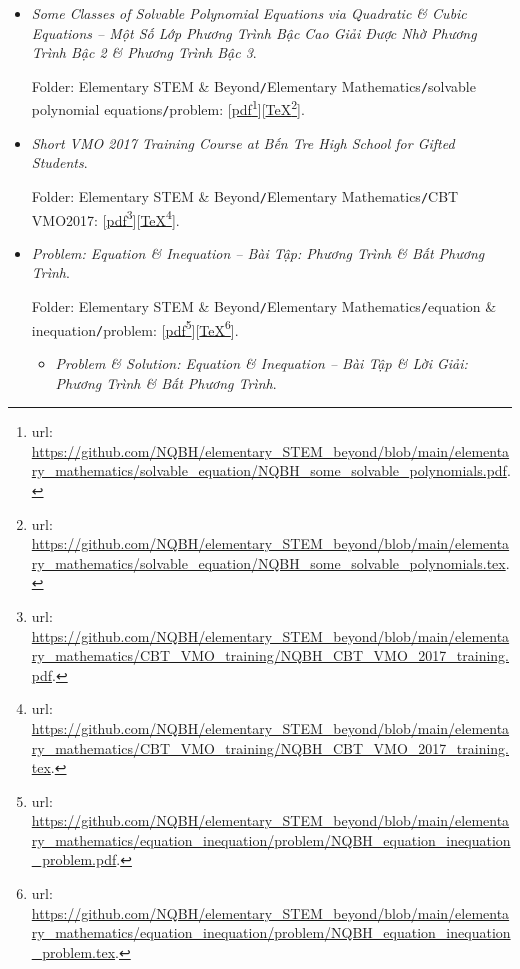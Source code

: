 \documentclass[12pt]{article}
\begin{document}
\begin{itemize}
	\item {\it Some Classes of Solvable Polynomial Equations via Quadratic \& Cubic Equations -- Một Số Lớp Phương Trình Bậc Cao Giải Được Nhờ Phương Trình Bậc 2 \& Phương Trình Bậc 3}.
	
	Folder: {\sf Elementary STEM \& Beyond{\tt/}Elementary Mathematics{\tt/}solvable polynomial equations{\tt/}problem}: [\href{https://github.com/NQBH/elementary_STEM_beyond/blob/main/elementary_mathematics/solvable_equation/NQBH_some_solvable_polynomials.pdf}{pdf}\footnote{{\sc url}: \url{https://github.com/NQBH/elementary_STEM_beyond/blob/main/elementary_mathematics/solvable_equation/NQBH_some_solvable_polynomials.pdf}.}][\href{https://github.com/NQBH/elementary_STEM_beyond/blob/main/elementary_mathematics/solvable_equation/NQBH_some_solvable_polynomials.tex}{\TeX}\footnote{{\sc url}: \url{https://github.com/NQBH/elementary_STEM_beyond/blob/main/elementary_mathematics/solvable_equation/NQBH_some_solvable_polynomials.tex}.}].
	\item {\it Short VMO 2017 Training Course at Bến Tre High School for Gifted Students}.
	
	Folder: {\sf Elementary STEM \& Beyond{\tt/}Elementary Mathematics{\tt/}CBT VMO2017}: [\href{https://github.com/NQBH/elementary_STEM_beyond/blob/main/elementary_mathematics/CBT_VMO_training/NQBH_CBT_VMO_2017_training.pdf}{pdf}\footnote{{\sc url}: \url{https://github.com/NQBH/elementary_STEM_beyond/blob/main/elementary_mathematics/CBT_VMO_training/NQBH_CBT_VMO_2017_training.pdf}.}][\href{https://github.com/NQBH/elementary_STEM_beyond/blob/main/elementary_mathematics/CBT_VMO_training/NQBH_CBT_VMO_2017_training.tex}{\TeX}\footnote{{\sc url}: \url{https://github.com/NQBH/elementary_STEM_beyond/blob/main/elementary_mathematics/CBT_VMO_training/NQBH_CBT_VMO_2017_training.tex}.}].
	\item {\it Problem: Equation \& Inequation -- Bài Tập: Phương Trình \& Bất Phương Trình}.
	
	Folder: {\sf Elementary STEM \& Beyond{\tt/}Elementary Mathematics{\tt/}equation \& inequation{\tt/}problem}: [\href{https://github.com/NQBH/elementary_STEM_beyond/blob/main/elementary_mathematics/equation_inequation/problem/NQBH_equation_inequation_problem.pdf}{pdf}\footnote{{\sc url}: \url{https://github.com/NQBH/elementary_STEM_beyond/blob/main/elementary_mathematics/equation_inequation/problem/NQBH_equation_inequation_problem.pdf}.}][\href{https://github.com/NQBH/elementary_STEM_beyond/blob/main/elementary_mathematics/equation_inequation/problem/NQBH_equation_inequation_problem.tex}{\TeX}\footnote{{\sc url}: \url{https://github.com/NQBH/elementary_STEM_beyond/blob/main/elementary_mathematics/equation_inequation/problem/NQBH_equation_inequation_problem.tex}.}].
	\begin{itemize}
		\item {\it Problem \& Solution: Equation \& Inequation -- Bài Tập \& Lời Giải: Phương Trình \& Bất Phương Trình}.
		

\end{itemize}
\end{itemize}
\end{document}
